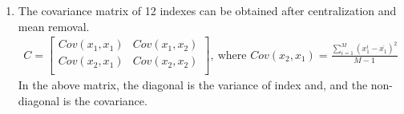 \begin{enumerate}[\bfseries 1.]
    \setlength{\parsep}{0ex} %
    \setlength{\topsep}{0ex} %
    \setlength{\itemsep}{0ex} %
    \item The covariance matrix of 12 indexes can be obtained after centralization and mean removal.
    \begin{align}
        C=\left[ \begin{matrix}
	    Cov\left( x_1,x_1 \right)&		Cov\left( x_1,x_2 \right)\\
	    Cov\left( x_2,x_1 \right)&		Cov\left( x_2,x_2 \right)\\
        \end{matrix} \right] ,\ \text{where\ }Cov\left( x_2,x_1 \right) =\frac{\sum_{i=1}^M{\left( x_{1}^{i}-\overline{x_1} \right) ^2}}{M-1}
    \end{align}
    In the above matrix, the diagonal is the variance of index and, and the non-diagonal is the covariance.
   

\end{enumerate}
